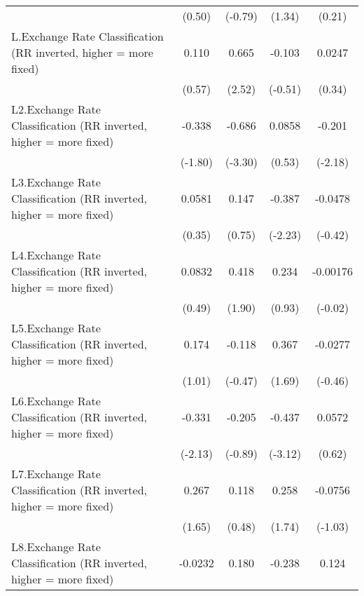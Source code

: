 {\begin{longtable}{l*{4}{c}}
                &   (0.50)         &  (-0.79)         &   (1.34)         &   (0.21)         \\
\addlinespace
L.Exchange Rate Classification (RR inverted, higher = more fixed)&    0.110         &    0.665\sym{*}  &   -0.103         &   0.0247         \\
                &   (0.57)         &   (2.52)         &  (-0.51)         &   (0.34)         \\
\addlinespace
L2.Exchange Rate Classification (RR inverted, higher = more fixed)&   -0.338         &   -0.686\sym{***}&   0.0858         &   -0.201\sym{*}  \\
                &  (-1.80)         &  (-3.30)         &   (0.53)         &  (-2.18)         \\
\addlinespace
L3.Exchange Rate Classification (RR inverted, higher = more fixed)&   0.0581         &    0.147         &   -0.387\sym{*}  &  -0.0478         \\
                &   (0.35)         &   (0.75)         &  (-2.23)         &  (-0.42)         \\
\addlinespace
L4.Exchange Rate Classification (RR inverted, higher = more fixed)&   0.0832         &    0.418         &    0.234         & -0.00176         \\
                &   (0.49)         &   (1.90)         &   (0.93)         &  (-0.02)         \\
\addlinespace
L5.Exchange Rate Classification (RR inverted, higher = more fixed)&    0.174         &   -0.118         &    0.367         &  -0.0277         \\
                &   (1.01)         &  (-0.47)         &   (1.69)         &  (-0.46)         \\
\addlinespace
L6.Exchange Rate Classification (RR inverted, higher = more fixed)&   -0.331\sym{*}  &   -0.205         &   -0.437\sym{**} &   0.0572         \\
                &  (-2.13)         &  (-0.89)         &  (-3.12)         &   (0.62)         \\
\addlinespace
L7.Exchange Rate Classification (RR inverted, higher = more fixed)&    0.267         &    0.118         &    0.258         &  -0.0756         \\
                &   (1.65)         &   (0.48)         &   (1.74)         &  (-1.03)         \\
\addlinespace
L8.Exchange Rate Classification (RR inverted, higher = more fixed)&  -0.0232         &    0.180         &   -0.238         &    0.124         \\

\end{longtable}}
